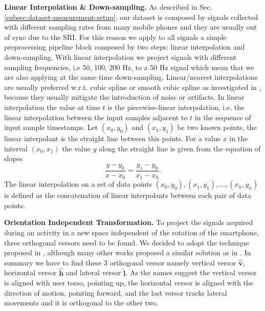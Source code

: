 \textbf{Linear Interpolation \& Down-sampling.} As described in
Sec. \ref{subsec:dataset-measurement-setup}, our dataset is composed
by signals collected with different sampling rates from many mobile
phones and they are usually out of sync due to the SRI. For this
reason we apply to all signals a simple preprocessing pipeline block
composed by two steps: linear interpolation and down-sampling. With
linear interpolation we project signals with different sampling
frequencies, i.e 50, 100, 200 Hz, to a 50 Hz signal which mean that
we are also applying at the same time down-sampling. Linear/nearest
interpolations are usually preferred w.r.t. cubic spline or smooth
cubic spline as investigated in \cite{stisen2015smart}, because they
usually mitigate the introduction of noise or artifacts. In linear
interpolation the value at time $t$ is the piecewise-linear
interpolation, i.e. the linear interpolation between the input samples
adjacent to $t$ in the sequence of input sample timestamps. Let $(x_0,
y_0)$ and $(x_1, y_1)$ be two known points, the linear interpolant is
the straight line between this points. For a value $x$ in the interval
$(x_0, x_1)$ the value $y$ along the straight line is given from the
equation of slopes
\begin{equation}
  \label{eq:linear-interpolation}
  \frac{y - y_0}{x - x_0} = \frac{y_1 - y_0}{x_1 - x_0}.
\end{equation}
The linear interpolation on a set of data points $(x_0, y_0), (x_1, y_1), \ldots, (x_n, y_n)$ is defined as the concatenation of linear interpolants between each pair of data points.


\vspace{1em}
\textbf{Orientation Independent Transformation.}
To project the signals acquired during an activity in a new space independent of the rotation of the smartphone, three orthogonal versors need to be found. We decided to adopt the technique proposed in \cite{gadaleta2018idnet}, although many other works proposed a similar solution as in \cite{kunze2009way, henpraserttae2011accurate}. In summary we have to find these 3 orthogonal versor namely vertical versor $\boldsymbol{\hat{v}}$, horizontal versor $\boldsymbol{\hat{h}}$ and lateral versor $\boldsymbol{\hat{l}}$. As the names suggest the vertical versor is aligned with user torso, pointing up, the horizontal versor is aligned with the direction of motion, pointing forward, and the last versor tracks lateral movements and it is orthogonal to the other two.


